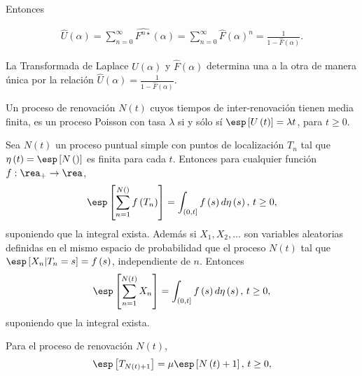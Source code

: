 Entonces

\begin{eqnarray*}
\hat{U}\left(\alpha\right)=\sum_{n=0}^{\infty}\hat{F^{n\star}}\left(\alpha\right)=\sum_{n=0}^{\infty}\hat{F}\left(\alpha\right)^{n}=\frac{1}{1-\hat{F}\left(\alpha\right)}.
\end{eqnarray*}


\begin{Prop}
La Transformada de Laplace $\hat{U}\left(\alpha\right)$ y $\hat{F}\left(\alpha\right)$ determina una a la otra de manera \'unica por la relaci\'on $\hat{U}\left(\alpha\right)=\frac{1}{1-\hat{F}\left(\alpha\right)}$.
\end{Prop}


\begin{Note}
Un proceso de renovaci\'on $N\left(t\right)$ cuyos tiempos de inter-renovaci\'on tienen media finita, es un proceso Poisson con tasa $\lambda$ si y s\'olo s\'i $\esp\left[U\left(t\right)\right]=\lambda t$, para $t\geq0$.
\end{Note}


\begin{Teo}
Sea $N\left(t\right)$ un proceso puntual simple con puntos de localizaci\'on $T_{n}$ tal que $\eta\left(t\right)=\esp\left[N\left(\right)\right]$ es finita para cada $t$. Entonces para cualquier funci\'on $f:\rea_{+}\rightarrow\rea$,
\begin{eqnarray*}
\esp\left[\sum_{n=1}^{N\left(\right)}f\left(T_{n}\right)\right]=\int_{\left(0,t\right]}f\left(s\right)d\eta\left(s\right)\textrm{,  }t\geq0,
\end{eqnarray*}
suponiendo que la integral exista. Adem\'as si $X_{1},X_{2},\ldots$ son variables aleatorias definidas en el mismo espacio de probabilidad que el proceso $N\left(t\right)$ tal que $\esp\left[X_{n}|T_{n}=s\right]=f\left(s\right)$, independiente de $n$. Entonces
\begin{eqnarray*}
\esp\left[\sum_{n=1}^{N\left(t\right)}X_{n}\right]=\int_{\left(0,t\right]}f\left(s\right)d\eta\left(s\right)\textrm{,  }t\geq0,
\end{eqnarray*} 
suponiendo que la integral exista. 
\end{Teo}

\begin{Coro}
Para el proceso de renovaci\'on $N\left(t\right)$,
\begin{eqnarray*}
\esp\left[T_{N\left(t\right)+1}\right]=\mu\esp\left[N\left(t\right)+1\right]\textrm{,  }t\geq0,
\end{eqnarray*}  
\end{Coro}

